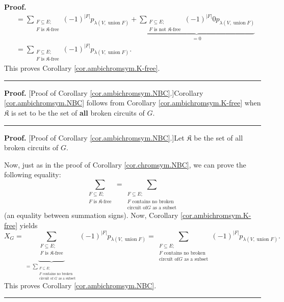 \documentclass[numbers=enddot,12pt,final,onecolumn,notitlepage]{scrartcl}%
\theoremstyle{definition}
\newenvironment{proof}[1][Proof]{\noindent\textbf{#1.} }{\ \rule{0.5em}{0.5em}}
\newenvironment{verlong}{}{}
\newenvironment{vershort}{}{}
\let\sumnonlimits\sum
\renewcommand{\sum}{\sumnonlimits\limits}
\begin{document}
\begin{verlong}
\begin{proof}
\begin{align*}
&  =\sum_{\substack{F\subseteq E;\\F\text{ is }\mathfrak{K}\text{-free}%
}}\left(  -1\right)  ^{\left\vert F\right\vert }p_{\lambda\left(
V,\operatorname*{union}F\right)  }+\underbrace{\sum_{\substack{F\subseteq
E;\\F\text{ is not }\mathfrak{K}\text{-free}}}\left(  -1\right)  ^{\left\vert
F\right\vert }0p_{\lambda\left(  V,\operatorname*{union}F\right)  }}_{=0}\\
&  =\sum_{\substack{F\subseteq E;\\F\text{ is }\mathfrak{K}\text{-free}%
}}\left(  -1\right)  ^{\left\vert F\right\vert }p_{\lambda\left(
V,\operatorname*{union}F\right)  }.
\end{align*}
This proves Corollary \ref{cor.ambichromsym.K-free}.
\end{proof}
\end{verlong}

\begin{vershort}
\begin{proof}
[Proof of Corollary \ref{cor.ambichromsym.NBC}.]Corollary
\ref{cor.ambichromsym.NBC} follows from Corollary
\ref{cor.ambichromsym.K-free} when $\mathfrak{K}$ is set to be the set of
\textbf{all} broken circuits of $G$.
\end{proof}
\end{vershort}

\begin{verlong}
\begin{proof}
[Proof of Corollary \ref{cor.ambichromsym.NBC}.]Let $\mathfrak{K}$ be the set
of all broken circuits of $G$.

Now, just as in the proof of Corollary \ref{cor.chromsym.NBC}, we can prove
the following equality:
\[
\sum_{\substack{F\subseteq E;\\F\text{ is }\mathfrak{K}\text{-free}}%
}=\sum_{\substack{F\subseteq E;\\F\text{ contains no broken}\\\text{circuit of
}G\text{ as a subset}}}
\]
(an equality between summation signs). Now, Corollary
\ref{cor.ambichromsym.K-free} yields%
\[
X_{G}=\underbrace{\sum_{\substack{F\subseteq E;\\F\text{ is }\mathfrak{K}%
\text{-free}}}}_{=\sum_{\substack{F\subseteq E;\\F\text{ contains no
broken}\\\text{circuit of }G\text{ as a subset}}}}\left(  -1\right)
^{\left\vert F\right\vert }p_{\lambda\left(  V,\operatorname*{union}F\right)
}=\sum_{\substack{F\subseteq E;\\F\text{ contains no broken}\\\text{circuit of
}G\text{ as a subset}}}\left(  -1\right)  ^{\left\vert F\right\vert
}p_{\lambda\left(  V,\operatorname*{union}F\right)  }.
\]
This proves Corollary \ref{cor.ambichromsym.NBC}.
\end{proof}
\end{verlong}
\end{document}
